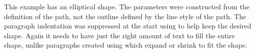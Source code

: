 \begin{minipage}[b]{150bp}
\noindent
This example has an elliptical shape. The parameters were
constructed from the definition of the path, not the outline
defined by the line style of the path. The paragraph indentation
was suppressed at the start using  to help keep
the desired shape. Again it needs to have just the right amount of
text to fill the entire shape, unlike paragraphs created using
 which expand or shrink to fit the shape.
\par
\end{minipage}
